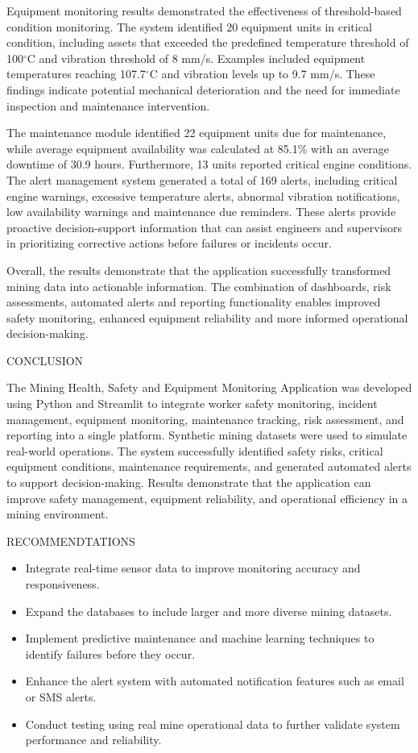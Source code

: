 \documentclass[
]{article}
\begin{document}
Equipment monitoring results demonstrated the effectiveness of
threshold-based condition monitoring. The system identified 20
equipment units in critical condition, including assets that exceeded
the predefined temperature threshold of 100$^\circ$C and vibration
threshold of 8 mm/s. Examples included equipment temperatures reaching
107.7$^\circ$C and vibration levels up to 9.7 mm/s. These findings
indicate potential mechanical deterioration and the need for immediate
inspection and maintenance intervention.

The maintenance module identified 22 equipment units due for
maintenance, while average equipment availability was calculated at
85.1\% with an average downtime of 30.9 hours. Furthermore, 13 units
reported critical engine conditions. The alert management system
generated a total of 169 alerts, including critical engine warnings,
excessive temperature alerts, abnormal vibration notifications, low
availability warnings and maintenance due reminders. These alerts
provide proactive decision-support information that can assist
engineers and supervisors in prioritizing corrective actions before
failures or incidents occur.

Overall, the results demonstrate that the application successfully
transformed mining data into actionable information. The combination
of dashboards, risk assessments, automated alerts and reporting
functionality enables improved safety monitoring, enhanced equipment
reliability and more informed operational decision-making.


CONCLUSION 

The Mining Health, Safety and Equipment Monitoring Application was developed using Python and Streamlit to integrate worker safety monitoring, incident management, equipment monitoring, maintenance tracking, risk assessment, and reporting into a single platform. Synthetic mining datasets were used to simulate real-world operations. The system successfully identified safety risks, critical equipment conditions, maintenance requirements, and generated automated alerts to support decision-making. Results demonstrate that the application can improve safety management, equipment reliability, and operational efficiency in a mining environment.

RECOMMENDTATIONS

\begin{itemize}
    \item Integrate real-time sensor data to improve monitoring accuracy and responsiveness.
    \item Expand the databases to include larger and more diverse mining datasets.
    \item Implement predictive maintenance and machine learning techniques to identify failures before they occur.
    \item Enhance the alert system with automated notification features such as email or SMS alerts.
    \item Conduct testing using real mine operational data to further validate system performance and reliability.
\end{itemize}
\end{document}
